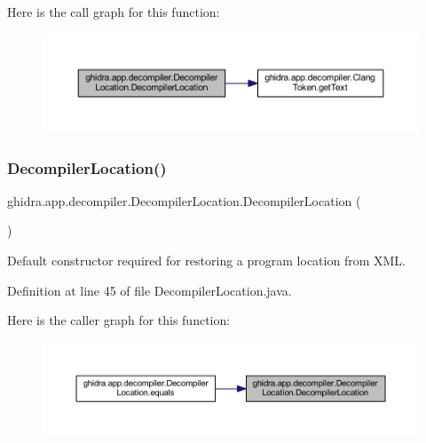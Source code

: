 Here is the call graph for this function\+:
\nopagebreak
\begin{figure}[H]
\begin{center}
\leavevmode
\includegraphics[width=350pt]{classghidra_1_1app_1_1decompiler_1_1_decompiler_location_a5c86c9169222bc1b6e57e42cfe5bb80c_cgraph}
\end{center}
\end{figure}
\mbox{\label{classghidra_1_1app_1_1decompiler_1_1_decompiler_location_addd0bff6b1fff762ca8c0aadd7c5e213}} 
\subsubsection{\texorpdfstring{DecompilerLocation()}{DecompilerLocation()}\hspace{0.1cm}{\footnotesize\ttfamily [2/2]}}
{\footnotesize\ttfamily ghidra.\+app.\+decompiler.\+Decompiler\+Location.\+Decompiler\+Location (\begin{DoxyParamCaption}{ }\end{DoxyParamCaption})\hspace{0.3cm}{\ttfamily [inline]}}

Default constructor required for restoring a program location from X\+ML. 

Definition at line 45 of file Decompiler\+Location.\+java.

Here is the caller graph for this function\+:
\nopagebreak
\begin{figure}[H]
\begin{center}
\leavevmode
\includegraphics[width=350pt]{classghidra_1_1app_1_1decompiler_1_1_decompiler_location_addd0bff6b1fff762ca8c0aadd7c5e213_icgraph}
\end{center}
\end{figure}



